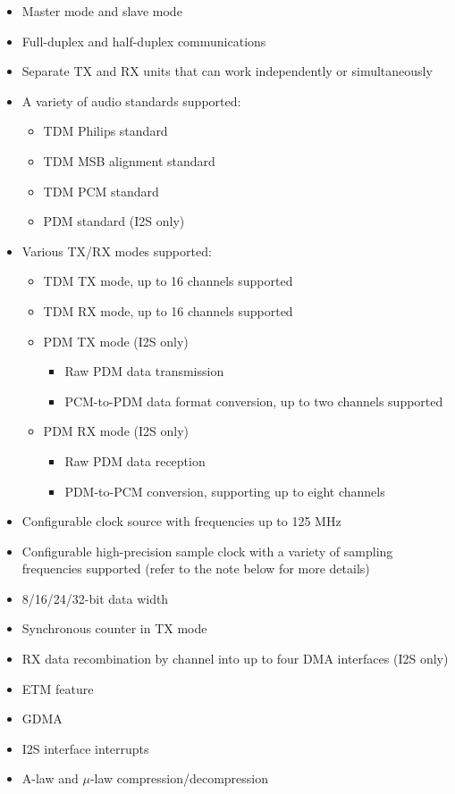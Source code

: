 \documentclass[main\_\_EN.tex]{subfiles}
\begin{document}
\begin{itemize}
    \item Master mode and slave mode
    \item Full-duplex and half-duplex communications
    \item Separate TX and RX units that can work independently or simultaneously
    \item A variety of audio standards supported: 
        \begin{itemize}
            \item TDM Philips standard
            \item TDM MSB alignment standard
            \item TDM PCM standard
            \item PDM standard (I2S only)
        \end{itemize}
    \item Various TX/RX modes supported:
        \begin{itemize}
        \item TDM TX mode, up to 16 channels supported
        \item TDM RX mode, up to 16 channels supported
        \item PDM TX mode (I2S only)
        \begin{itemize}
            \item Raw PDM data transmission
            \item PCM-to-PDM data format conversion, up to two channels supported
        \end{itemize}
        \item PDM RX mode (I2S only)
        \begin{itemize}
            \item Raw PDM data reception
            \item PDM-to-PCM conversion, supporting up to eight channels
        \end{itemize}
        \end{itemize}
    \item Configurable clock source with frequencies up to 125 MHz
    \item Configurable high-precision sample clock with a variety of sampling frequencies supported (refer to the note below for more details)
    \item 8/16/24/32-bit data width
    \item Synchronous counter in TX mode
    \item RX data recombination by channel into up to four DMA interfaces (I2S only)
    \item ETM feature
    \item GDMA
    \item I2S interface interrupts
    \item A-law and $\mu$-law compression/decompression
\end{itemize}
\end{document}
